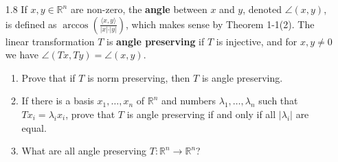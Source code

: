 \begin{enumerate}
\begin{proof}
\begin{enumerate}
        \item Suppose that \( T \) is norm preserving (and therefore, also inner product preserving) and that
        \begin{align*}
            T(x) &= T(y)\\
            \intertext{then}
            T(x) - T(y) &= 0 \\
            T(x-y) &= 0 \\
            \left| T(x-y) \right| &= 0 \\
            \left| x-y \right| &= 0 \\
            \intertext{which implies that}
            x-y &= 0 \\
            x &= y
        \end{align*}
        Therefore, \( T \) is injective. Since injectivity of a linear transformation is equivalent to surjectivity, it follows that \( T^{-1} \) exists. To show that \( T^{-1} \) is of the same sort, we show that it is norm preserving. Observe that
        \[
        \left| T^{-1}(y) \right| = \left| x \right| = \left| T(x) \right| = \left| y \right|
        \]
    \end{enumerate}
    \end{proof}
    
    \item[1.8] If \( x,y \in \mathbb{R}^n \) are non-zero, the \textbf{angle} between \( x \) and \( y \), denoted \( \angle(x,y) \), is defined as \( \arccos \left( \frac{\langle x, y \rangle}{\vert x \vert \cdot \vert y \vert} \right) \), which makes sense by Theorem 1-1(2). The linear transformation \( T \) is \textbf{angle preserving} if \( T \) is injective, and for \( x,y \neq 0 \) we have \( \angle(Tx,Ty) = \angle(x,y) \).
    \begin{enumerate}
        \item Prove that if \( T \) is norm preserving, then \( T \) is angle preserving.
        
        \item If there is a basis \( x_1, \ldots, x_n \) of \( \mathbb{R}^n \) and numbers \( \lambda_1, \ldots, \lambda_n \) such that \( Tx_i = \lambda_i x_i \), prove that \( T \) is angle preserving if and only if all \( \vert \lambda_i \vert \) are equal.
        
        \item What are all angle preserving \( T: \mathbb{R}^n \rightarrow \mathbb{R}^n \)?
    \end{enumerate}
    

\end{enumerate}
